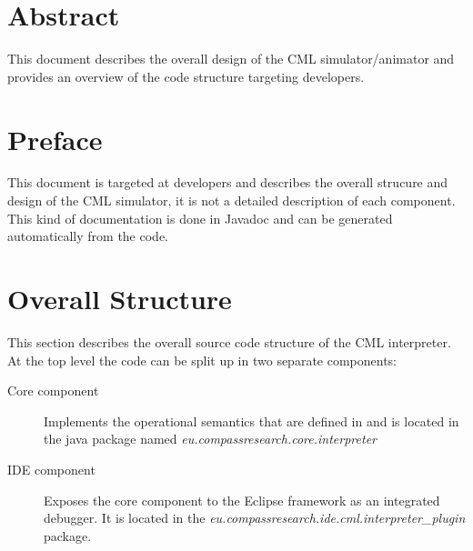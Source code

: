 \documentclass[a4paper, 12pt]{include/compassreport}   %
\begin{document}
\maketitle


\section*{Abstract}
\label{sec:abstract}

This document describes the overall design of the CML
simulator/animator and provides an overview of the code structure
targeting developers.

\newpage

\tableofcontents
\newpage

\section{Preface}
This document is targeted at developers and describes the overall
strucure and design of the CML simulator, it is not a detailed
description of each component. This kind of documentation is done in
Javadoc and can be generated automatically from the code.



\section{Overall Structure}
\label{sec:introduction}
This section describes the overall source code structure of the CML
interpreter. At the top level the code can be split up in two separate
components:

\begin{description}
\item[Core component] Implements the operational semantics that are
defined in \cite{D23.3} and is located in the java package named
\emph{eu.compassresearch.core.interpreter}
\item[IDE component] Exposes the core component to the Eclipse
framework as an integrated debugger. It is located in the
\emph{eu.compassresearch.ide.cml.interpreter\_plugin} package.
\end{description}
\end{document}
